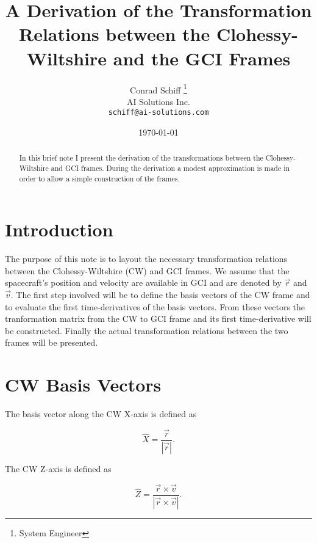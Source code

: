\documentclass[twocolumn]{article}
\begin{document}
\title{A Derivation of the Transformation Relations between the 
       Clohessy-Wiltshire and the GCI Frames}
\author{Conrad Schiff \thanks{System Engineer} \\
        AI Solutions Inc.\\
	  \texttt{schiff@ai-solutions.com}}
\date{\today}
\maketitle

\begin{abstract}
In this brief note I present the derivation of the transformations between the 
Clohessy-Wiltshire and GCI frames.  During the derivation a modest approximation
is made in order to allow a simple construction of the frames.
\end{abstract}

\section{Introduction}\label{S:intro}
The purpose of this note is to layout the necessary transformation relations 
between the Clohessy-Wiltshire (CW) and GCI frames.  We assume that the 
spacecraft's position and velocity are available in GCI and are denoted by 
${\vec r}$ and ${\vec v}$.  The first step involved will be to define the basis 
vectors of the CW frame and to evaluate the first time-derivatives of the basis 
vectors.  From these vectors the tranformation matrix from the CW to GCI frame 
and its first time-derivative will be constructed.  Finally the actual 
transformation relations between the two frames will be presented.


\section{CW Basis Vectors}\label{S:CW_vecs}
The basis vector along the CW X-axis is defined as

\begin{equation}\label{eq:Xhat}
	{\hat X} = \frac{\vec r}{  | \vec r |}.
\end{equation}

The CW Z-axis is defined as 

\begin{equation}\label{eq:Zhat}
	{\hat Z} = \frac{ \vec r \times \vec v} { |  \vec r \times \vec v  |}.
\end{equation}
\end{document}
